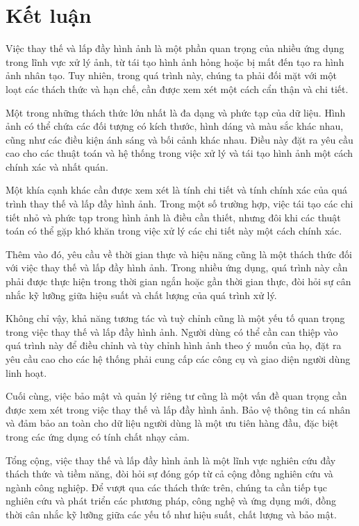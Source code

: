\documentclass[12pt]{report}
\begin{document}
\section{Kết luận}

Việc thay thế và lấp đầy hình ảnh là một phần quan trọng của nhiều ứng dụng trong lĩnh vực xử lý ảnh, từ tái tạo hình ảnh hỏng hoặc bị mất đến tạo ra hình ảnh nhân tạo. Tuy nhiên, trong quá trình này, chúng ta phải đối mặt với một loạt các thách thức và hạn chế, cần được xem xét một cách cẩn thận và chi tiết.

Một trong những thách thức lớn nhất là đa dạng và phức tạp của dữ liệu. Hình ảnh có thể chứa các đối tượng có kích thước, hình dáng và màu sắc khác nhau, cũng như các điều kiện ánh sáng và bối cảnh khác nhau. Điều này đặt ra yêu cầu cao cho các thuật toán và hệ thống trong việc xử lý và tái tạo hình ảnh một cách chính xác và nhất quán.

Một khía cạnh khác cần được xem xét là tính chi tiết và tính chính xác của quá trình thay thế và lấp đầy hình ảnh. Trong một số trường hợp, việc tái tạo các chi tiết nhỏ và phức tạp trong hình ảnh là điều cần thiết, nhưng đôi khi các thuật toán có thể gặp khó khăn trong việc xử lý các chi tiết này một cách chính xác.

Thêm vào đó, yêu cầu về thời gian thực và hiệu năng cũng là một thách thức đối với việc thay thế và lấp đầy hình ảnh. Trong nhiều ứng dụng, quá trình này cần phải được thực hiện trong thời gian ngắn hoặc gần thời gian thực, đòi hỏi sự cân nhắc kỹ lưỡng giữa hiệu suất và chất lượng của quá trình xử lý.

Không chỉ vậy, khả năng tương tác và tuỳ chỉnh cũng là một yếu tố quan trọng trong việc thay thế và lấp đầy hình ảnh. Người dùng có thể cần can thiệp vào quá trình này để điều chỉnh và tùy chỉnh hình ảnh theo ý muốn của họ, đặt ra yêu cầu cao cho các hệ thống phải cung cấp các công cụ và giao diện người dùng linh hoạt.

Cuối cùng, việc bảo mật và quản lý riêng tư cũng là một vấn đề quan trọng cần được xem xét trong việc thay thế và lấp đầy hình ảnh. Bảo vệ thông tin cá nhân và đảm bảo an toàn cho dữ liệu người dùng là một ưu tiên hàng đầu, đặc biệt trong các ứng dụng có tính chất nhạy cảm.

Tổng cộng, việc thay thế và lấp đầy hình ảnh là một lĩnh vực nghiên cứu đầy thách thức và tiềm năng, đòi hỏi sự đóng góp từ cả cộng đồng nghiên cứu và ngành công nghiệp. Để vượt qua các thách thức trên, chúng ta cần tiếp tục nghiên cứu và phát triển các phương pháp, công nghệ và ứng dụng mới, đồng thời cân nhắc kỹ lưỡng giữa các yếu tố như hiệu suất, chất lượng và bảo mật.
\end{document}
